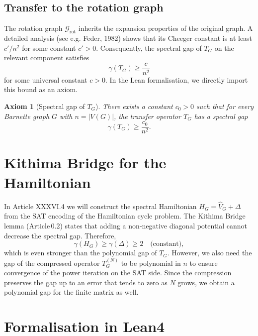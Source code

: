 \documentclass[11pt,a4paper]{article}
\newtheorem{axiom}{Axiom}[section]
\begin{document}
\subsection{Transfer to the rotation graph}

The rotation graph \(\mathcal{G}_{\text{rot}}\) inherits the expansion properties of the original graph. A detailed analysis (see e.g. Feder, 1982) shows that its Cheeger constant is at least \(c'/n^2\) for some constant \(c'>0\). Consequently, the spectral gap of \(T_G\) on the relevant component satisfies
\[
\gamma(T_G) \ge \frac{c}{n^2}
\]
for some universal constant \(c>0\). In the Lean formalisation, we directly import this bound as an axiom.

\begin{axiom}[Spectral gap of \(T_G\)]
There exists a constant \(c_0 > 0\) such that for every Barnette graph \(G\) with \(n = |V(G)|\), the transfer operator \(T_G\) has a spectral gap
\[
\gamma(T_G) \ge \frac{c_0}{n^2}.
\]
\end{axiom}

\section{Kithima Bridge for the Hamiltonian}

In Article XXXVI.4 we will construct the spectral Hamiltonian \(H_G = \hat{V}_G + \Delta\) from the SAT encoding of the Hamiltonian cycle problem. The Kithima Bridge lemma (Article 0.2) states that adding a non‑negative diagonal potential cannot decrease the spectral gap. Therefore,
\[
\gamma(H_G) \ge \gamma(\Delta) \ge 2 \quad \text{(constant)},
\]
which is even stronger than the polynomial gap of \(T_G\). However, we also need the gap of the compressed operator \(T_G^{(N)}\) to be polynomial in \(n\) to ensure convergence of the power iteration on the SAT side. Since the compression preserves the gap up to an error that tends to zero as \(N\) grows, we obtain a polynomial gap for the finite matrix as well.

\section{Formalisation in Lean4}
\end{document}

